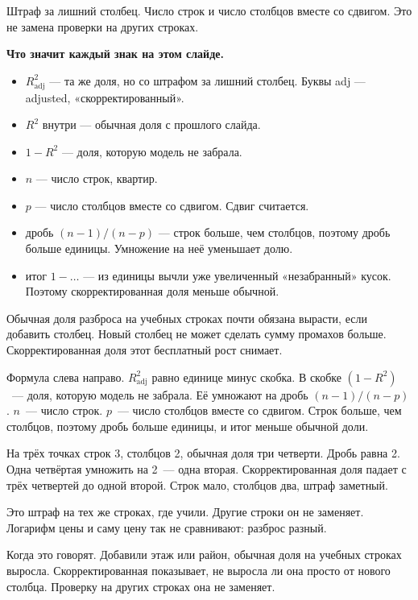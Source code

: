 \documentclass[11pt,a4paper]{article}
\newcommand{\slidehead}[2]{\par\vspace{4mm}{\color{navy}\large\bfseries Слайд #1. #2}\par\vspace{1mm}}
\newcommand{\screen}[1]{\par{\color{ink}\small #1\par}\vspace{1mm}}
\newcommand{\say}[1]{\begin{saybox}#1\end{saybox}}
\newenvironment{signs}{\begin{signbox}{\bfseries Что значит каждый знак на этом слайде.}\par\begin{itemize}[leftmargin=1.15em,itemsep=2pt,topsep=3pt,parsep=0pt]}{\end{itemize}\end{signbox}}
\begin{document}
\slidehead{23}{Скорректированный}
\screen{Штраф за лишний столбец. Число строк и число столбцов вместе со сдвигом. Это не замена проверки на других строках.}
\begin{signs}
\item \(R^{2}_{\mathrm{adj}}\) — та же доля, но со штрафом за лишний столбец. Буквы adj — adjusted, «скорректированный».
\item \(R^{2}\) внутри — обычная доля с прошлого слайда.
\item \(1-R^{2}\) — доля, которую модель не забрала.
\item \(n\) — число строк, квартир.
\item \(p\) — число столбцов вместе со сдвигом. Сдвиг считается.
\item дробь \((n-1)/(n-p)\) — строк больше, чем столбцов, поэтому дробь больше единицы. Умножение на неё уменьшает долю.
\item итог \(1-\ldots\) — из единицы вычли уже увеличенный «незабранный» кусок. Поэтому скорректированная доля меньше обычной.
\end{signs}
\say{Обычная доля разброса на учебных строках почти обязана вырасти, если добавить столбец. Новый столбец не может сделать сумму промахов больше. Скорректированная доля этот бесплатный рост снимает.

Формула слева направо. \(R^{2}_{\mathrm{adj}}\) равно единице минус скобка. В скобке \((1-R^{2})\)~--- доля, которую модель не забрала. Её умножают на дробь \((n-1)/(n-p)\). \(n\)~--- число строк. \(p\)~--- число столбцов вместе со сдвигом. Строк больше, чем столбцов, поэтому дробь больше единицы, и итог меньше обычной доли.

На трёх точках строк 3, столбцов 2, обычная доля три четверти. Дробь равна 2. Одна четвёртая умножить на 2~--- одна вторая. Скорректированная доля падает с трёх четвертей до одной второй. Строк мало, столбцов два, штраф заметный.

Это штраф на тех же строках, где учили. Другие строки он не заменяет. Логарифм цены и саму цену так не сравнивают: разброс разный.

Когда это говорят. Добавили этаж или район, обычная доля на учебных строках выросла. Скорректированная показывает, не выросла ли она просто от нового столбца. Проверку на других строках она не заменяет.}
\end{document}
